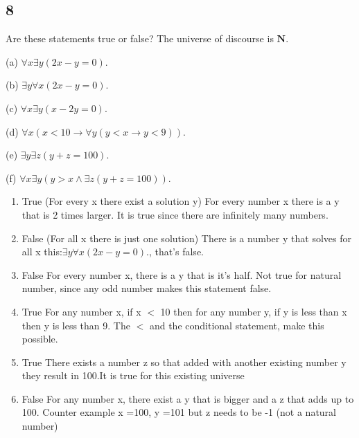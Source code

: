 \documentclass{article}
\begin{document}
\subsection{8}
Are these statements true or false? The universe of discourse is $\mathbf{N}$.

(a) $\forall x \exists y(2x - y = 0).$

(b) $\exists y \forall x(2x - y = 0).$

(c) $\forall x \exists y(x - 2y = 0).$

(d) $\forall x(x <10 \rightarrow \forall y(y < x \rightarrow y < 9)).$

(e) $\exists y\exists z(y + z = 100).$

(f) $\forall x\exists y(y > x \land \exists z(y + z = 100)).$
\begin{enumerate}[label=(\alph*)]
\item 
    True (For every x there exist a solution y) For every number x there is a y that is 2 times larger. It is true since there are infinitely many numbers.
    \item
    False (For all x there is just one solution) There is a number y that solves for all x this:$\exists y \forall x(2x - y = 0).$, that's false.
    \item
    False For every number x, there is a y that is it's half. Not true for natural number, since any odd number makes this statement false.
    \item
    True For any number x, if x $<$ 10 then for any number y, if y is less than x then y is less than 9. The $<$ and the conditional statement, make this possible.
    \item
    True There exists a number z so that added with another existing number y they result in 100.It is true for this existing universe 
    \item
    False For any number x, there exist a y that is bigger and a z that adds up to 100. Counter example x =100, y =101 but z needs to be -1 (not a natural number)
\end{enumerate}
\end{document}
